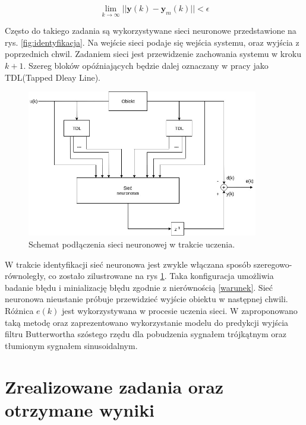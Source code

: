 \documentclass{article}
\newcommand{\bb}{\textbf}
\begin{document}
\begin{equation}
	\displaystyle{\lim_{k \to \infty}} ||\bb{y}(k)-\bb{y}_m(k)|| < \epsilon
\end{equation}

Często do takiego zadania są wykorzystywane sieci neuronowe przedstawione na rys. \ref{fig:identyfikacja}. Na wejście sieci podaje się wejścia systemu, oraz wyjścia z poprzednich chwil. Zadaniem sieci jest przewidzenie zachowania systemu w kroku $k+1$. Szereg bloków opóźniających będzie dalej oznaczany w pracy jako TDL(Tapped Dleay Line).

\begin{figure}
\centering
	\includegraphics[width=0.90\textwidth]{ident2.jpg}\par\vspace{1cm}
\caption{Schemat podłączenia sieci neuronowej w trakcie uczenia.}
	\label{fig:identyfikacja2}
\end{figure}

W trakcie identyfikacji sieć neuronowa jest zwykle włączana sposób szeregowo-równoległy, co zostało zilustrowane na rys \ref{fig:identyfikacja2}. Taka konfiguracja umożliwia badanie błędu i minializację błędu zgodnie z nierównością \ref{warunek}. Sieć neuronowa nieustanie próbuje przewidzieć wyjście obiektu w następnej chwili. Różnica $e(k)$ jest wykorzystywana w procesie uczenia sieci. W \cite{Osowski} zaproponowano taką metodę oraz zaprezentowano wykorzystanie modelu do predykcji wyjścia filtru Butterwortha szóstego rzędu dla pobudzenia sygnałem trójkątnym oraz tłumionym sygnałem sinusoidalnym.

\section{Zrealizowane zadania oraz otrzymane wyniki}
\end{document}
